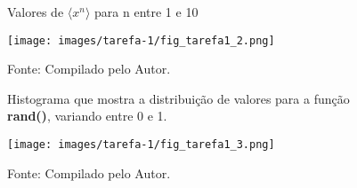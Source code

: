 \begin{figure}[h!]
\centering
\caption{Valores de $\langle x^n \rangle$ para n entre 1 e 10}
  \centering
  \texttt{[image: images/tarefa-1/fig\_tarefa1\_2.png]}
\caption*{Fonte: Compilado pelo Autor.}
\label{fig:tarefa 1 - <x^n> para difererentes n =1,10}
\end{figure}

\vspace*{2\baselineskip}

\begin{figure}[h!]
\centering
\caption{Histograma que mostra a distribuição de valores para a função \textbf{rand()}, variando entre 0 e 1.}
  \centering
  \texttt{[image: images/tarefa-1/fig\_tarefa1\_3.png]}
\caption*{Fonte: Compilado pelo Autor.}
\label{fig:tarefa 1 - histograma rand()}
\end{figure}

